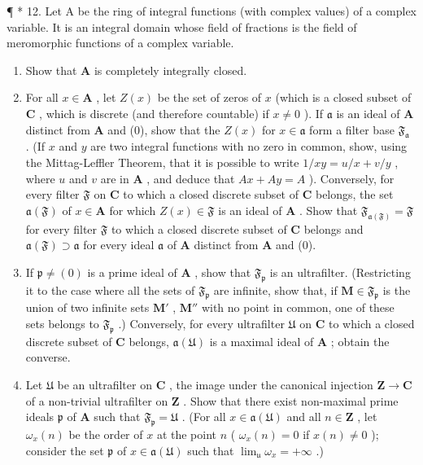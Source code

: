 ¶ * 12. Let A be the ring of integral functions (with complex values) of a complex variable. It is an integral domain whose field of fractions is the field of meromorphic functions of a complex variable.

\begin{enumerate}
\def\labelenumi{(\alph{enumi})}
\item
  Show that \(\mathbf{A}\) is completely integrally closed.
\item
  For all \(x \in \mathbf{A}\) , let \(Z(x)\) be the set of zeros of \(x\) (which is a closed subset of \(\mathbf{C}\) , which is discrete (and therefore countable) if \(x \neq 0\) ). If \(\mathfrak{a}\) is an ideal of \(\mathbf{A}\) distinct from \(\mathbf{A}\) and (0), show that the \(Z(x)\) for \(x \in \mathfrak{a}\) form a filter base \(\mathfrak{F}_{\mathfrak{a}}\) . (If \(x\) and \(y\) are two integral functions with no zero in common, show, using the Mittag-Leffler Theorem, that it is possible to write \(1 / xy = u / x + v / y\) , where \(u\) and \(v\) are in \(\mathbf{A}\) , and deduce that \(Ax + Ay = A\) ). Conversely, for every filter \(\mathfrak{F}\) on \(\mathbf{C}\) to which a closed discrete subset of \(\mathbf{C}\) belongs, the set \(\mathfrak{a}(\mathfrak{F})\) of \(x \in \mathbf{A}\) for which \(Z(x) \in \mathfrak{F}\) is an ideal of \(\mathbf{A}\) . Show that \(\mathfrak{F}_{\mathfrak{a}(\mathfrak{F})} = \mathfrak{F}\) for every filter \(\mathfrak{F}\) to which a closed discrete subset of \(\mathbf{C}\) belongs and \(\mathfrak{a}(\mathfrak{F}) \supset \mathfrak{a}\) for every ideal \(\mathfrak{a}\) of \(\mathbf{A}\) distinct from \(\mathbf{A}\) and (0).
\item
  If \(\mathfrak{p} \neq (0)\) is a prime ideal of \(\mathbf{A}\) , show that \(\mathfrak{F}_{\mathfrak{p}}\) is an ultrafilter. (Restricting it to the case where all the sets of \(\mathfrak{F}_{\mathfrak{p}}\) are infinite, show that, if \(\mathbf{M} \in \mathfrak{F}_{\mathfrak{p}}\) is the union of two infinite sets \(\mathbf{M}'\) , \(\mathbf{M}''\) with no point in common, one of these sets belongs to \(\mathfrak{F}_{\mathfrak{p}}\) .) Conversely, for every ultrafilter \(\mathfrak{U}\) on \(\mathbf{C}\) to which a closed discrete subset of \(\mathbf{C}\) belongs, \(\mathfrak{a}(\mathfrak{U})\) is a maximal ideal of \(\mathbf{A}\) ; obtain the converse.
\item
  Let \(\mathfrak{U}\) be an ultrafilter on \(\mathbf{C}\) , the image under the canonical injection \(\mathbf{Z} \to \mathbf{C}\) of a non-trivial ultrafilter on \(\mathbf{Z}\) . Show that there exist non-maximal prime ideals \(\mathfrak{p}\) of \(\mathbf{A}\) such that \(\mathfrak{F}_{\mathfrak{p}} = \mathfrak{U}\) . (For all \(x \in \mathfrak{a}(\mathfrak{U})\) and all \(n \in \mathbf{Z}\) , let \(\omega_x(n)\) be the order of \(x\) at the point \(n\) ( \(\omega_x(n) = 0\) if \(x(n) \neq 0\) ); consider the set \(\mathfrak{p}\) of \(x \in \mathfrak{a}(\mathfrak{U})\) such that \(\lim_{\mathfrak{u}} \omega_x = +\infty\) .)

\end{enumerate}
